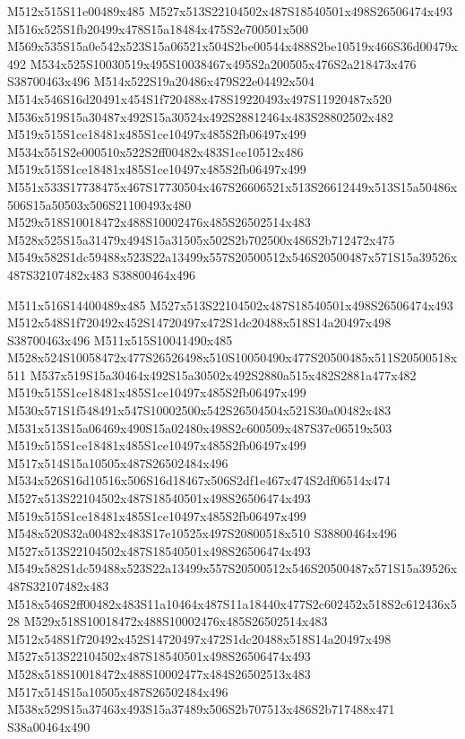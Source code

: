 \documentclass{article}
\begin{document}
\begin{multicols}{2}
M512x515S11e00489x485 M527x513S22104502x487S18540501x498S26506474x493 M516x525S1fb20499x478S15a18484x475S2e700501x500 M569x535S15a0e542x523S15a06521x504S2be00544x488S2be10519x466S36d00479x492 M534x525S10030519x495S10038467x495S2a200505x476S2a218473x476 S38700463x496 M514x522S19a20486x479S22e04492x504 M514x546S16d20491x454S1f720488x478S19220493x497S11920487x520 M536x519S15a30487x492S15a30524x492S28812464x483S28802502x482 M519x515S1ce18481x485S1ce10497x485S2fb06497x499 M534x551S2e000510x522S2ff00482x483S1ce10512x486 M519x515S1ce18481x485S1ce10497x485S2fb06497x499 M551x533S17738475x467S17730504x467S26606521x513S26612449x513S15a50486x506S15a50503x506S21100493x480 M529x518S10018472x488S10002476x485S26502514x483 M528x525S15a31479x494S15a31505x502S2b702500x486S2b712472x475 M549x582S1dc59488x523S22a13499x557S20500512x546S20500487x571S15a39526x487S32107482x483 S38800464x496

M511x516S14400489x485 M527x513S22104502x487S18540501x498S26506474x493 M512x548S1f720492x452S14720497x472S1dc20488x518S14a20497x498 S38700463x496 M511x515S10041490x485 M528x524S10058472x477S26526498x510S10050490x477S20500485x511S20500518x511 M537x519S15a30464x492S15a30502x492S2880a515x482S2881a477x482 M519x515S1ce18481x485S1ce10497x485S2fb06497x499 M530x571S1f548491x547S10002500x542S26504504x521S30a00482x483 M531x513S15a06469x490S15a02480x498S2c600509x487S37c06519x503 M519x515S1ce18481x485S1ce10497x485S2fb06497x499 M517x514S15a10505x487S26502484x496 M534x526S16d10516x506S16d18467x506S2df1e467x474S2df06514x474 M527x513S22104502x487S18540501x498S26506474x493 M519x515S1ce18481x485S1ce10497x485S2fb06497x499 M548x520S32a00482x483S17e10525x497S20800518x510 S38800464x496 M527x513S22104502x487S18540501x498S26506474x493 M549x582S1dc59488x523S22a13499x557S20500512x546S20500487x571S15a39526x487S32107482x483 M518x546S2ff00482x483S11a10464x487S11a18440x477S2c602452x518S2c612436x528 M529x518S10018472x488S10002476x485S26502514x483 M512x548S1f720492x452S14720497x472S1dc20488x518S14a20497x498 M527x513S22104502x487S18540501x498S26506474x493 M528x518S10018472x488S10002477x484S26502513x483 M517x514S15a10505x487S26502484x496 M538x529S15a37463x493S15a37489x506S2b707513x486S2b717488x471 S38a00464x490


\end{multicols}
\end{document}
